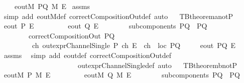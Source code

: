 \begin{isabellebody}
\ \ \ \ {\isachardoublequoteopen}eoutM\ PQ\ M\ E{\isachardoublequoteclose}\isanewline
%
\isadelimproof
%
\endisadelimproof
%
\isatagproof
{}\isamarkupfalse%
\ assms\ \isamarkupfalse%
\ {\isacharparenleft}simp\ add{\isacharcolon}\ eoutM{\isacharunderscore}def\ correctCompositionOut{\isacharunderscore}def{\isacharcomma}\ auto{\isacharparenright}%
\endisatagproof
{\isafoldproof}%
%
\isadelimproof
\ \isanewline
%
\endisadelimproof
\isanewline
{}\isamarkupfalse%
\ TBtheorem{}a{\isacharunderscore}notP{}{\isacharcolon}\isanewline
{}\ {\isachardoublequoteopen}eout\ P\ E{\isachardoublequoteclose}\isanewline
\ \ \ \ \ \ \ \ {\isachardoublequoteopen}{\isasymnot}\ eout\ Q\ E{\isachardoublequoteclose}\isanewline
\ \ \ \ \ \ \ \ {\isachardoublequoteopen}subcomponents\ PQ\ {\isacharequal}\ {\isacharbraceleft}P{\isacharcomma}Q{\isacharbraceright}{\isachardoublequoteclose}\isanewline
\ \ \ \ \ \ \ \ {\isachardoublequoteopen}correctCompositionOut\ PQ{\isachardoublequoteclose}\isanewline
\ \ \ \ \ \ \ \ {\isachardoublequoteopen}{\isasymexists}\ ch{\isachardot}\ {\isacharparenleft}{\isacharparenleft}out{\isacharunderscore}exprChannelSingle\ P\ ch\ E{\isacharparenright}\ {\isasymand}\ {\isacharparenleft}ch\ {\isasymin}\ {\isacharparenleft}loc\ PQ{\isacharparenright}{\isacharparenright}{\isacharparenright}{\isachardoublequoteclose}\isanewline
{}\ \ \ \ {\isachardoublequoteopen}{\isasymnot}\ eout\ PQ\ E{\isachardoublequoteclose}\isanewline
%
\isadelimproof
%
\endisadelimproof
%
\isatagproof
{}\isamarkupfalse%
\ assms\ \isanewline
{}\isamarkupfalse%
\ {\isacharparenleft}simp\ add{\isacharcolon}\ eout{\isacharunderscore}def\ correctCompositionOut{\isacharunderscore}def\ \isanewline
\ \ \ \ \ \ \ \ \ \ \ \ \ \ \ \ \ \ \ \ \ \ out{\isacharunderscore}exprChannelSingle{\isacharunderscore}def{\isacharcomma}\ auto{\isacharparenright}%
\endisatagproof
{\isafoldproof}%
%
\isadelimproof
\ \isanewline
%
\endisadelimproof
\isanewline
{}\isamarkupfalse%
\ TBtheorem{}b{\isacharunderscore}notP{}{\isacharcolon}\isanewline
{}\ {\isachardoublequoteopen}eoutM\ P\ M\ E{\isachardoublequoteclose}\isanewline
\ \ \ \ \ \ \ \ {\isachardoublequoteopen}{\isasymnot}\ eoutM\ Q\ M\ E{\isachardoublequoteclose}\isanewline
\ \ \ \ \ \ \ \ {\isachardoublequoteopen}subcomponents\ PQ\ {\isacharequal}\ {\isacharbraceleft}P{\isacharcomma}Q{\isacharbraceright}{\isachardoublequoteclose}\isanewline

\end{isabellebody}
